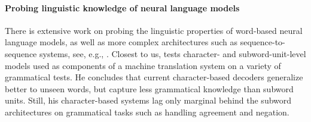 \paragraph{Probing linguistic knowledge of neural language models} There is extensive work on probing the linguistic properties of
word-based neural language models, as well as more complex
architectures such as sequence-to-sequence systems, see, e.g.,
. Closest
to us,  tests character- and subword-unit-level
models used as components of a machine translation system on a variety
of grammatical tests. He concludes that current character-based
decoders generalize better to unseen words, but capture less
grammatical knowledge than subword units. Still, his character-based
systems lag only marginal behind the subword architectures on
grammatical tasks such as handling agreement and negation.







